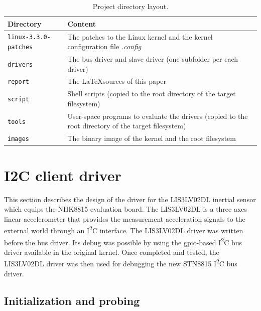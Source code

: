 \documentclass[a4paper,10pt]{article}
\newcommand{\iic}{I\textsuperscript{2}C }
\begin{document}
\begin{multicols}{2}
\begin{table}
	\centering
	\renewcommand{\arraystretch}{1.2}	
	\begin{tabular}{p{5cm} p{11cm}}
		\hline
		Directory & Content \\
		\hline
		\texttt{linux-3.3.0-patches} & The patches to the Linux kernel and the 
			kernel configuration file \emph{.config}\\
		\texttt{drivers} & The bus driver and slave driver (one subfolder per
			each driver) \\
		\texttt{report} & The \LaTeX sources of this paper \\
		\texttt{script} & Shell scripts (copied to the root directory of the
			target filesystem) \\
		\texttt{tools} & User-space programs to evaluate the drivers (copied to
			the root directory of the target filesystem) \\
		\texttt{images} & The binary image of the kernel and the root
			filesystem \\
		\hline
	\end{tabular}
	\caption{Project directory layout.}
	\label{table:project-dir-layout}
\end{table}




\section{I2C client driver}
\label{sec:i2c_client_driver}

This section describes the design of the driver for the LIS3LV02DL inertial
sensor which equips the NHK8815 evaluation board.
The LIS3LV02DL is a three axes linear accelerometer that provides the measurement 
acceleration signals to the external world through an \iic interface.
The LIS3LV02DL driver was written before the bus driver. Its debug was possible
by using the gpio-based \iic bus driver available in the original kernel. Once
completed and tested, the LIS3LV02DL driver was then used for debugging the new
STN8815 \iic bus driver.\\



\subsection{Initialization and probing}
\label{sec:lis3_init_probe}


\end{multicols}
\end{document}
